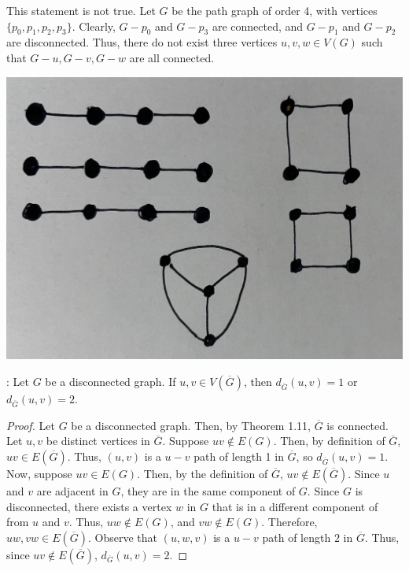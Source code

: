 \documentclass[12pt]{article}
\begin{document}
\bigskip
{}
This statement is not true.
Let $G$ be the path graph of order 4, with vertices $\{p_0, p_1, p_2, p_3\}$.
Clearly, $G - p_0$ and $G - p_3$ are connected, and $G - p_1$ and $G - p_2$ are disconnected.
Thus, there do not exist three vertices $u,v,w \in V(G)$ such that $G-u,G-v,G-w$ are all connected.

\bigskip
{}
\begin{center}
\includegraphics[scale=.05]{HW2-graph1.JPG}
\end{center}

\bigskip
{}: Let $G$ be a disconnected graph. If $u,v \in V(\overline{G})$, then $d_{\overline{G}}(u,v) = 1$ or $d_{\overline{G}}(u,v) = 2$.
\begin{proof}
Let $G$ be a disconnected graph.
Then, by Theorem 1.11, $\overline{G}$ is connected.
Let $u,v$ be distinct vertices in $\overline G$.
Suppose $uv \notin E(G)$.
Then, by definition of $\overline{G}$, $uv \in E(\overline{G})$.
Thus, $(u,v)$ is a $u-v$ path of length 1 in $\overline G$, so $d_{\overline{G}}(u,v) = 1$.
Now, suppose $uv \in E(G)$.
Then, by the definition of $\overline{G}$, $uv \notin E({\overline{G}})$.
Since $u$ and $v$ are adjacent in $G$, they are in the same component of $G$.
Since $G$ is disconnected, there exists a vertex $w$ in $G$ that is in a different component of from $u$ and $v$.
Thus, $uw \notin E(G)$, and $vw \notin E(G)$.
Therefore, $uw, vw \in E(\overline G)$.
Observe that $(u, w, v)$ is a $u-v$ path of length $2$ in $\overline G$.
Thus, since $uv \notin E(\overline G)$, $d_{\overline{G}}(u,v) = 2$.
\end{proof}

\bigskip
{}

\end{document}
